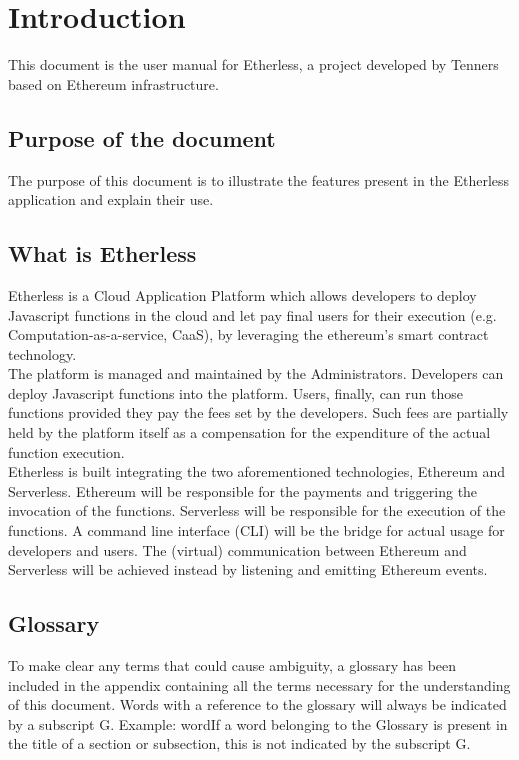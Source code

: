 \section{Introduction}
This document is the user manual for Etherless, a project developed by Tenners based on Ethereum infrastructure.

\subsection{Purpose of the document}
The purpose of this document is to illustrate the features present in the Etherless application and explain their use.

\subsection{What is Etherless}
Etherless is a Cloud Application Platform which allows developers to deploy Javascript functions in the cloud and let pay final users for their execution (e.g. Computation-as-a-service, CaaS), by leveraging the ethereum's smart contract technology.\\
The platform is managed and maintained by the Administrators. 
Developers can deploy Javascript functions into the platform. Users, finally, can run those functions provided they pay the fees set by the developers. Such fees are partially held by the platform itself as a compensation for the expenditure of the actual function execution.\\
Etherless is built integrating the two aforementioned technologies, Ethereum and Serverless. Ethereum will be responsible for the payments and triggering the invocation of the functions. Serverless will be responsible for the execution of the functions. A command line interface (CLI) will be the bridge for actual usage for developers and users. The (virtual) communication between Ethereum and Serverless will be achieved instead by listening and emitting Ethereum events. 


\subsection{Glossary}
To make clear any terms that could cause ambiguity, a glossary has been included in the appendix containing all the terms necessary for the understanding of this document. Words with a reference to the glossary will always be indicated by a subscript G. Example: word\glo If a word belonging to the Glossary is present in the title of a section or subsection, this is not indicated by the subscript G.
